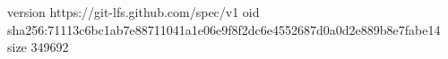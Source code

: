 version https://git-lfs.github.com/spec/v1
oid sha256:71113c6bc1ab7e88711041a1e06e9f8f2dc6e4552687d0a0d2e889b8e7fabe14
size 349692
